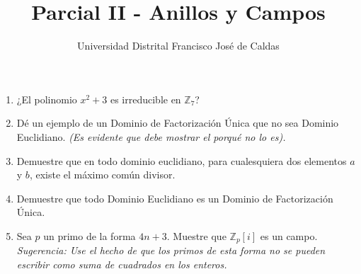 \documentclass[12pt]{article}
\title{Parcial II - Anillos y Campos}
\author{Universidad Distrital Francisco José de Caldas}
\date{}
\begin{document}
\maketitle

\begin{enumerate}
    \item ¿El polinomio \(x^2 + 3\) es irreducible en \(\mathbb{Z}_7\)?
    
    \item Dé un ejemplo de un Dominio de Factorización Única que no sea Dominio Euclidiano. 
    \textit{(Es evidente que debe mostrar el porqué no lo es).}
    
    \item Demuestre que en todo dominio euclidiano, para cualesquiera dos elementos \(a\) y \(b\), existe el máximo común divisor.

    \item Demuestre que todo Dominio Euclidiano es un Dominio de Factorización Única.
    
    \item Sea \(p\) un primo de la forma \(4n + 3\). Muestre que \(\mathbb{Z}_p[i]\) es un campo. 
    \textit{Sugerencia: Use el hecho de que los primos de esta forma no se pueden escribir como suma de cuadrados en los enteros.}
\end{enumerate}
\end{document}

